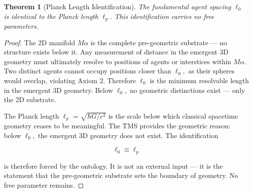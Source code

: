 \documentclass[11pt,oneside]{report}
\newtheorem{theorem}{Theorem}[section]
\theoremstyle{definition}
\theoremstyle{remark}
\begin{document}
\begin{theorem}[Planck Length Identification]
The fundamental agent spacing \ensuremath{\ell_{0}}
is identical to the Planck length \ensuremath{\ell_{p}.} This identification carries no
free parameters.
\end{theorem}

\begin{proof}
The 2D manifold \ensuremath{M\alpha} is the complete pre-geometric substrate --- no
structure exists below it. Any measurement of distance in the emergent
3D geometry must ultimately resolve to positions of agents or
interstices within \ensuremath{M\alpha .} Two distinct agents cannot occupy positions
closer than \ensuremath{\ell_{0},} as their spheres would overlap, violating Axiom 2.
Therefore \ensuremath{\ell_{0}} is the minimum resolvable length in the emergent 3D
geometry. Below \ensuremath{\ell_{0},} no geometric distinctions exist --- only the 2D
substrate.

The Planck length \ensuremath{\ell_{p}} = \ensuremath{\sqrt{\hbar G/c^{3}}} is the scale below which classical
spacetime geometry ceases to be meaningful. The TMS provides the
geometric reason: below \ensuremath{\ell_{0},} the emergent 3D geometry does not exist. The
identification

\begin{equation*}
\ell_{0} \equiv \ell_{p}
\end{equation*}

is therefore forced by the ontology. It is not an external input --- it
is the statement that the pre-geometric substrate sets the boundary of
geometry. No free parameter remains.

\end{proof}
\end{document}
